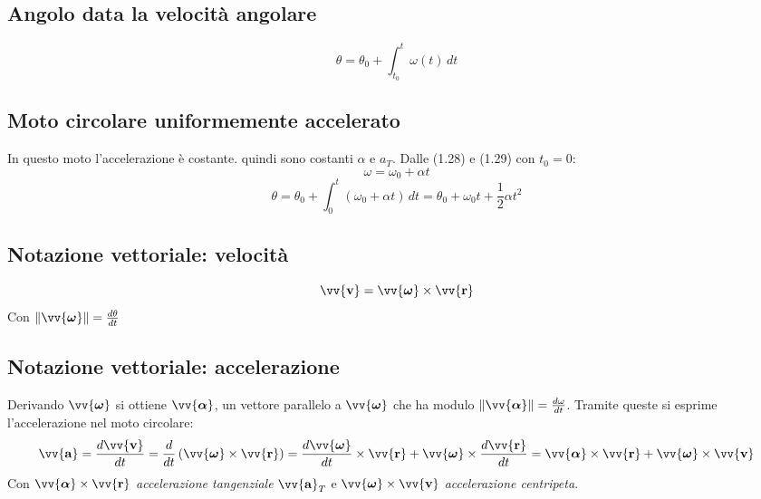 \documentclass{report}
\newcommand{\vett}[1]{\vv{\boldsymbol{\mathbf{#1}}}}
\begin{document}
\subsection{Angolo data la velocità angolare}
\begin{equation}
    \theta = \theta_0 + \int_{t_0}^{t}\omega(t)\,dt
\end{equation}

\subsection{Moto circolare uniformemente accelerato}
In questo moto l'accelerazione è costante. quindi sono costanti \(\alpha\)
e \(a_T\). Dalle (1.28) e (1.29) con \(t_0 = 0\):
\begin{equation*}
    \omega = \omega_0 + \alpha t
\end{equation*}
\begin{equation*}
    \theta = \theta_0 + \int_{0}^{t}(\omega_0 + \alpha t)\,dt
    = \theta_0 + \omega_0 t + \frac{1}{2}\alpha t^2
\end{equation*}


\subsection{Notazione vettoriale: velocità}
\begin{equation}
    \vett{v} = \vett{\omega} \times \vett{r}
\end{equation}
Con \(\norm{\vett{\omega}} = \frac{d\theta}{dt}\)

\subsection{Notazione vettoriale: accelerazione}
Derivando \(\vett{\omega}\) si ottiene \(\vett{\alpha}\), un vettore parallelo 
a \(\vett{\omega}\) che ha modulo \(\norm{\vett{\alpha}}  = \frac{d\omega}{dt}\).
Tramite queste si esprime l'accelerazione nel moto circolare:
\begin{equation}
    \vett{a} = \frac{d\vett{v}}{dt} 
    = \frac{d}{dt}\left(\vett{\omega} \times \vett{r}\right)
    = \frac{d\vett{\omega}}{dt} \times \vett{r} + \vett{\omega} \times \frac{d\vett{r}}{dt}
    = \vett{\alpha} \times \vett{r} + \vett{\omega} \times \vett{v}
\end{equation} 
Con \(\vett{\alpha} \times \vett{r}\) \emph{accelerazione tangenziale} \(\vett{a}_T\)
e \(\vett{\omega} \times \vett{v}\) \emph{accelerazione centripeta}.
\end{document}
